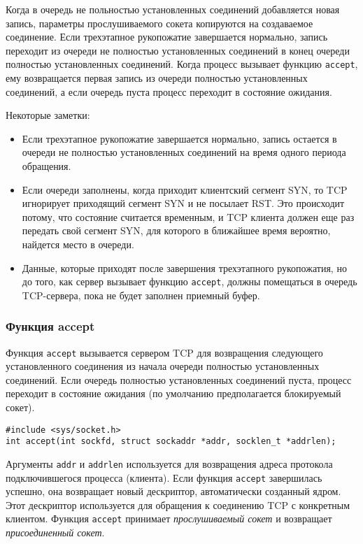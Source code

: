 Когда в очередь не польностью установленных соединений добавляется новая запись, параметры прослушиваемого сокета копируются на создаваемое соединение. Если трехэтапное рукопожатие завершается нормально, запись переходит из очереди не полностью установленных соединений в конец очереди полностью установленных соединений. Когда процесс вызывает функцию \lstinline{accept}, ему возвращается первая запись из очереди полностью установленных соединений, а если очередь пуста процесс переходит в состояние ожидания.

Некоторые заметки:
\begin{itemize}
  \item Если трехэтапное рукопожатие завершается нормально, запись остается в очереди не полностью установленных соединений на время одного периода обращения.
  \item Если очереди заполнены, когда приходит клиентский сегмент SYN, то TCP игнорирует приходящий сегмент SYN и не посылает RST. Это происходит потому, что состояние считается временным, и TCP клиента должен еще раз передать свой сегмент SYN, для которого в ближайшее время вероятно, найдется место в очереди.
  \item Данные, которые приходят после завершения трехэтапного рукопожатия, но до того, как сервер вызывает функцию \lstinline{accept}, должны помещаться в очередь TCP-сервера, пока не будет заполнен приемный буфер.
\end{itemize}

\subsubsection{Функция accept}
Функция \lstinline{accept} вызывается сервером TCP для возвращения следующего установленного соединения из начала очереди полностью установленных соединений. Если очередь полностью установленных соединений пуста, процесс переходит в состояние ожидания (по умолчанию предполагается блокируемый сокет).
\lstset{language=C,caption=}
\begin{lstlisting}
#include <sys/socket.h>
int accept(int sockfd, struct sockaddr *addr, socklen_t *addrlen);
\end{lstlisting}

Аргументы \lstinline{addr} и \lstinline{addrlen} используется для возвращения адреса протокола подключившегося процесса (клиента). Если функция \lstinline{accept} завершилась успешно, она возвращает новый дескриптор, автоматически созданный ядром. Этот дескриптор используется для обращения к соединению TCP с конкретным клиентом. Функция \lstinline{accept} принимает \emph{прослушиваемый сокет} и возвращает \emph{присоединенный сокет}.

